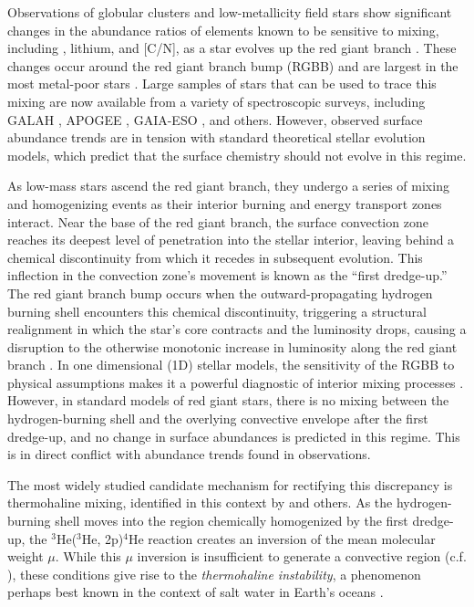 %
%
%
Observations of globular clusters and low-metallicity field stars show significant changes in the abundance ratios of elements known to be sensitive to mixing, including \ctwelvecthirteen, lithium, and [C/N], as a star evolves up the red giant branch \citep{Carbon1982, Pilachowski1986, Kraft1994, Shetrone2019}. These changes occur around the red giant branch bump (RGBB) and are largest in the most metal-poor stars \citep[e.g.][]{Gratton2000}. Large samples of stars that can be used to trace this mixing are now available from a variety of spectroscopic surveys, including GALAH \citep{buder2019}, APOGEE \citep{DR17}, GAIA-ESO \citep{Magrini2021b}, and others. However, observed surface abundance trends are in tension with standard theoretical stellar evolution models, which predict that the surface chemistry should not evolve in this regime.

As low-mass stars ascend the red giant branch, they undergo a series of mixing and homogenizing events as their interior burning and energy transport zones interact. Near the base of the red giant branch, the surface convection zone reaches its deepest level of penetration into the stellar interior, leaving behind a chemical discontinuity from which it recedes in subsequent evolution. This inflection in the convection zone's movement is known as the ``first dredge-up.'' The red giant branch bump occurs when the outward-propagating hydrogen burning shell encounters this chemical discontinuity, triggering a structural realignment in which the star's core contracts and the luminosity drops, causing a disruption to the otherwise monotonic increase in luminosity along the red giant branch \citep{Christensen-Dalsgaard:2015}. In one dimensional (1D) stellar models, the sensitivity of the RGBB to physical assumptions makes it a powerful diagnostic of interior mixing processes \citep[e.g.][]{Joyce2015, Khan2018}. 
%
However, in standard models of red giant stars, there is no mixing between the hydrogen-burning shell and the overlying convective envelope after the first dredge-up, and no change in surface abundances is predicted in this regime. This is in direct conflict with abundance trends found in observations.

The most widely studied candidate mechanism for rectifying this discrepancy is thermohaline mixing, identified in this context by \citet{charbonnel_thermohaline_2007} and others. As the hydrogen-burning shell moves into the region chemically homogenized by the  first dredge-up, the $^3$He($^3$He, 2p)$^4$He reaction creates an inversion of the mean molecular weight $\mu$. While this $\mu$ inversion is insufficient to generate a convective region (c.f. \citealt{CantielloLanger2010}), these conditions give rise to the 
\textit{thermohaline instability}, a phenomenon perhaps best known in the context of salt water in Earth's oceans \citep{Stern1960,baines_gill_1969}. 

